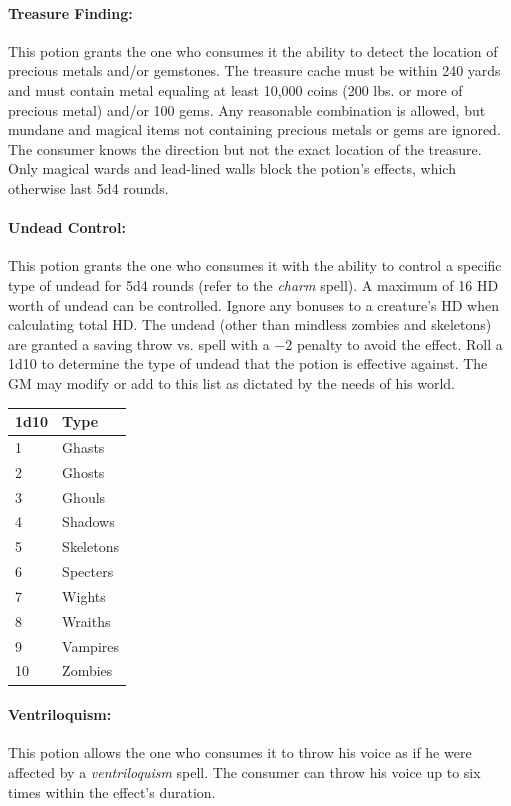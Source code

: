 \begin{multicols}{2}
\paragraph{Treasure Finding:} This potion grants the one who consumes it the ability to detect the location of precious metals and/or gemstones.  The treasure cache must be within 240 yards and must contain metal equaling at least 10,000 coins (200 lbs. or more of precious metal) and/or 100 gems.  Any reasonable combination is allowed, but mundane and magical items not containing precious metals or gems are ignored.  The consumer knows the direction but not the exact location of the treasure.  Only magical wards and lead-lined walls block the potion's effects, which otherwise last 5d4 rounds.

\paragraph{Undead Control:} This potion grants the one who consumes it with the ability to control a specific type of undead for 5d4 rounds (refer to the \textit{charm} spell).  A maximum of 16 HD worth of undead can be controlled.  Ignore any bonuses to a creature's HD when calculating total HD.  The undead (other than mindless zombies and skeletons) are granted a saving throw vs. spell with a $-2$ penalty to avoid the effect.  Roll a 1d10 to determine the type of undead that the potion is effective against.  The GM may modify or add to this list as dictated by the needs of his world.

\noindent
\begin{tabular}{|p{}|p{}|}
\hline
1d10	& Type \\
\hline\hline
\rowcolor[gray]{.9}1	& Ghasts \\
2	& Ghosts \\
\rowcolor[gray]{.9}3	& Ghouls \\
4	& Shadows \\
\rowcolor[gray]{.9}5	& Skeletons \\
6	& Specters \\
\rowcolor[gray]{.9}7	& Wights \\
8	& Wraiths \\
\rowcolor[gray]{.9}9	& Vampires \\
10	& Zombies \\
\hline
\end{tabular}

\paragraph{Ventriloquism:} This potion allows the one who consumes it to throw his voice as if he were affected by a \textit{ventriloquism} spell.  The consumer can throw his voice up to six times within the effect's duration.


\end{multicols}
